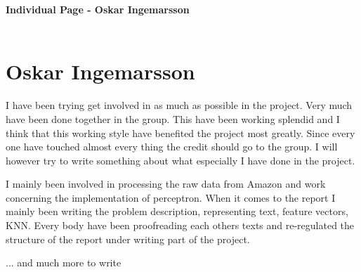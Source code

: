 \newpage
\textbf{Individual Page - Oskar Ingemarsson} \\\\
\section{Oskar Ingemarsson}
I have been trying get involved in as much as possible in the project.
Very much have been done together in the group. This have been working
splendid and I think that this working style have benefited the project most
greatly. Since every one have touched almost every thing the credit should go to
the group. I will however try to write something about what especially I have
done in the project.

I mainly been involved in processing the raw data from Amazon and work
concerning the implementation of perceptron. When it comes to the report I
mainly been writing the problem description, representing text, feature vectors,
KNN. Every body have been proofreading each others texts and re-regulated the
structure of the report under writing part of the project.

... and much more to write



